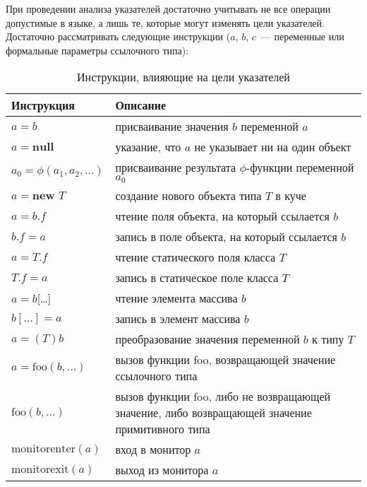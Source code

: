 \documentclass[14pt,titlepage]{extarticle}
\newcommand{\NEW}{\textbf{new }}
\newcommand{\NULL}{\textbf{null }}
\begin{document}
      При проведении анализа указателей достаточно учитывать не все операции
      допустимые в языке, а лишь те, которые могут изменять цели указателей.
      Достаточно рассматривать следующие инструкции ($a$, $b$, $c$~---
      переменные или формальные параметры ссылочного типа):
      \begin{table}
        \begin{tabular}{|l|p{120mm}|}\hline
          \textbf{Инструкция} & \textbf{Описание}\\ \hline

          $a = b$
          & присваивание значения $b$ переменной $a$ \\ \hline

          $a = \NULL$
          & указание, что $a$ не указывает ни на один объект \\ \hline

          $a_0 = \phi(a_1, a_2, \ldots)$
          & присваивание результата $\phi$-функции переменной $a_0$ \\ \hline

          $a = \NEW T$
          & создание нового объекта типа $T$ в куче \\ \hline

          $a = b.f$
          & чтение поля объекта, на который ссылается $b$ \\ \hline

          $b.f = a$
          & запись в поле объекта, на который ссылается $b$ \\ \hline

          $a = T.f$
          & чтение статического поля класса $T$ \\ \hline

          $T.f = a$
          & запись в статическое поле класса $T$ \\ \hline

          $a = b$[\ldots]
          & чтение элемента массива $b$ \\ \hline

          $b[\ldots] = a$
          & запись в элемент массива $b$ \\ \hline

          $a = (T)b$
          & преобразование значения переменной $b$ к типу $T$ \\ \hline

          $a = \textrm{foo}(b, \ldots)$
          & вызов функции foo, возвращающей значение ссылочного типа \\ \hline

          $\textrm{foo}(b, \ldots)$
          & вызов функции foo, либо не возвращающей значение, либо возвращающей значение примитивного типа \\ \hline

          $\textrm{monitorenter}(a)$
          & вход в монитор $a$ \\ \hline

          $\textrm{monitorexit}(a)$
          & выход из монитора $a$ \\ \hline
        \end{tabular}
        \caption{Инструкции, влияющие на цели указателей}
        \label{tabular:instructions}
      \end{table}
\end{document}
